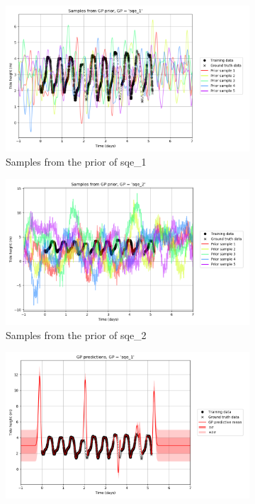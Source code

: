 \documentclass{article}
\begin{document}
\begin{figure}[pht]
    \centering
    \begin{subfigure}{0.45\textwidth}
        \centering
        \includegraphics[width=\textwidth]{Samples_from_GP_prior,_GP____sqe_1_.png}
        \caption{Samples from the prior of sqe\_1}
        \label{fig:prior_sqe_1}
    \end{subfigure}
    \begin{subfigure}{0.45\textwidth}
        \centering
        \includegraphics[width=\textwidth]{Samples_from_GP_prior,_GP____sqe_2_.png}
        \caption{Samples from the prior of sqe\_2}
        \label{fig:prior_sqe_2}
    \end{subfigure}
    \newline
    \begin{subfigure}{0.45\textwidth}
        \centering
        \includegraphics[width=\textwidth]{GP_predictions,_GP____sqe_1_.png}

\end{subfigure}
\end{figure}
\end{document}
